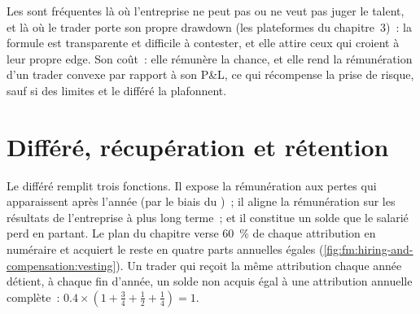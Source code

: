 \label{lst:fm:hiring-and-compensation:shrink}

\begin{omfigure}

\label{fig:fm:hiring-and-compensation:scatter}
\end{omfigure}

\begin{remark}\label{rem:fm:hiring-and-compensation:why}
Les  sont fréquentes là où l'entreprise ne peut pas ou ne veut pas juger le talent, et là où le trader porte son propre drawdown (les plateformes
du chapitre~3)~: la formule est transparente et difficile à contester, et elle attire ceux qui croient à leur propre edge. Son coût~: elle rémunère la chance, et
elle rend la rémunération d'un trader convexe par rapport à son P\&L, ce qui récompense la prise de risque, sauf si des limites et le différé la plafonnent.
\end{remark}

\section{Différé, récupération et rétention}

Le différé remplit trois fonctions. Il expose la rémunération aux pertes qui apparaissent après l'année (par le biais du )~; il aligne la rémunération sur les résultats
de l'entreprise à plus long terme~; et il constitue un solde que le salarié perd en partant. Le plan du chapitre verse 60~\% de chaque attribution en numéraire et acquiert le reste en quatre
parts annuelles égales (\cref{fig:fm:hiring-and-compensation:vesting}). Un trader qui reçoit la même attribution chaque année détient, à chaque fin d'année, un
solde non acquis égal à une attribution annuelle complète~: $0.4\times(1+\tfrac34+\tfrac12+\tfrac14)=1$.

